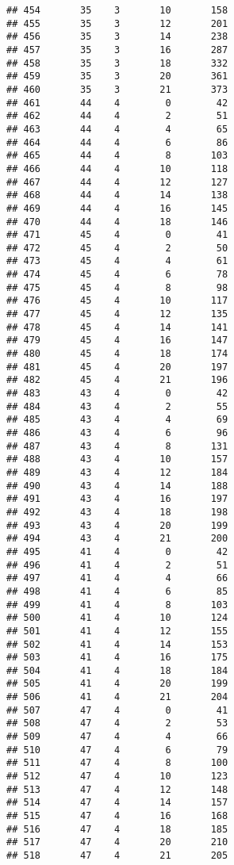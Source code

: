 \documentclass[
]{article}
\begin{document}
\begin{verbatim}
## 454       35    3       10       158
## 455       35    3       12       201
## 456       35    3       14       238
## 457       35    3       16       287
## 458       35    3       18       332
## 459       35    3       20       361
## 460       35    3       21       373
## 461       44    4        0        42
## 462       44    4        2        51
## 463       44    4        4        65
## 464       44    4        6        86
## 465       44    4        8       103
## 466       44    4       10       118
## 467       44    4       12       127
## 468       44    4       14       138
## 469       44    4       16       145
## 470       44    4       18       146
## 471       45    4        0        41
## 472       45    4        2        50
## 473       45    4        4        61
## 474       45    4        6        78
## 475       45    4        8        98
## 476       45    4       10       117
## 477       45    4       12       135
## 478       45    4       14       141
## 479       45    4       16       147
## 480       45    4       18       174
## 481       45    4       20       197
## 482       45    4       21       196
## 483       43    4        0        42
## 484       43    4        2        55
## 485       43    4        4        69
## 486       43    4        6        96
## 487       43    4        8       131
## 488       43    4       10       157
## 489       43    4       12       184
## 490       43    4       14       188
## 491       43    4       16       197
## 492       43    4       18       198
## 493       43    4       20       199
## 494       43    4       21       200
## 495       41    4        0        42
## 496       41    4        2        51
## 497       41    4        4        66
## 498       41    4        6        85
## 499       41    4        8       103
## 500       41    4       10       124
## 501       41    4       12       155
## 502       41    4       14       153
## 503       41    4       16       175
## 504       41    4       18       184
## 505       41    4       20       199
## 506       41    4       21       204
## 507       47    4        0        41
## 508       47    4        2        53
## 509       47    4        4        66
## 510       47    4        6        79
## 511       47    4        8       100
## 512       47    4       10       123
## 513       47    4       12       148
## 514       47    4       14       157
## 515       47    4       16       168
## 516       47    4       18       185
## 517       47    4       20       210
## 518       47    4       21       205

\end{verbatim}
\end{document}
